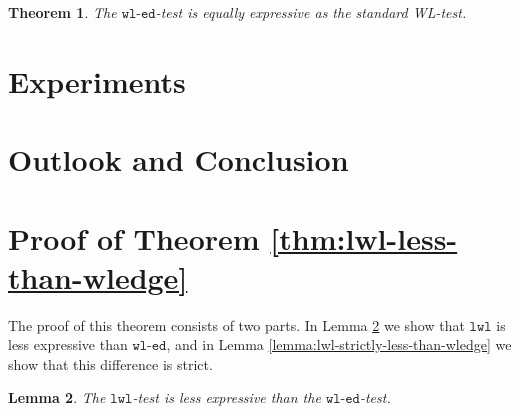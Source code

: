 \documentclass{article}
\newtheorem{theorem}{Theorem}
\newtheorem{lemma}[theorem]{Lemma}
\newcommand{\wledge}{\texttt{wl-ed}}
\newcommand{\lwl}{\texttt{lwl}}
\begin{document}
\begin{theorem} \label{thm:wledge-equal-to-wl}
    The $\wledge$-test is equally expressive as the standard WL-test.
\end{theorem}



\section{Experiments}



\section{Outlook and Conclusion}




\appendix
\section{Proof of Theorem \ref{thm:lwl-less-than-wledge}}   \label{app:proof-lwl-less-than-wledge}

The proof of this theorem consists of two parts. In Lemma \ref{lemma:lwl-less-than-wledge} we show that $\lwl$ is less expressive than $\wledge$, and in Lemma \ref{lemma:lwl-strictly-less-than-wledge} we show that this difference is strict.

\begin{lemma}   \label{lemma:lwl-less-than-wledge}
    The $\lwl$-test is less expressive than the $\wledge$-test.
\end{lemma}
\end{document}
